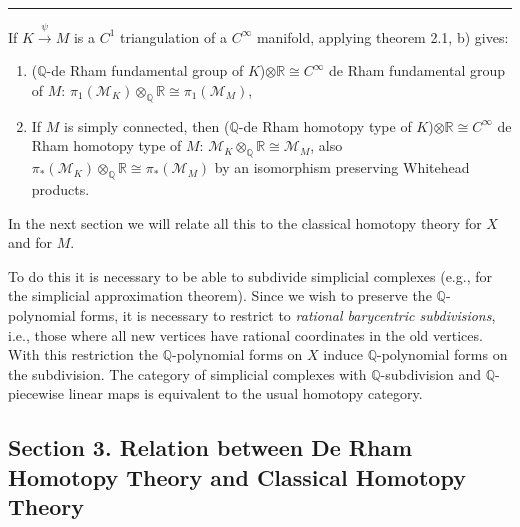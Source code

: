\documentclass[
  english,
  a3paper,
  a3paper]{extarticle}
\begin{document}
\clearpage



\par

\vspace{0.7mm}\hrule\vspace{1.6mm}

\fontsize{9}{11}\selectfont

If \(K\xrightarrow{\psi}M\) is a \(C^1\) triangulation of a \(C^\infty\)
manifold, applying theorem 2.1, b) gives:

\begin{enumerate}
\def\labelenumi{\arabic{enumi})}
\item
  (\(\mathbb Q\)-de Rham fundamental group of
  \(K\))\(\otimes\mathbb R\cong C^\infty\) de Rham fundamental group of
  \(M\):
  \(\pi_1(\mathcal M_K)\otimes_{\mathbb Q}\mathbb R\cong\pi_1(\mathcal M_M)\),
\item
  If \(M\) is simply connected, then (\(\mathbb Q\)-de Rham homotopy
  type of \(K\))\(\otimes\mathbb R\cong C^\infty\) de Rham homotopy type
  of \(M\):
  \(\mathcal M_K\otimes_{\mathbb Q}\mathbb R\cong\mathcal M_M\), also
  \(\pi_*(\mathcal M_K)\otimes_{\mathbb Q}\mathbb R\cong\pi_*(\mathcal M_M)\)
  by an isomorphism preserving Whitehead products.
\end{enumerate}

In the next section we will relate all this to the classical homotopy
theory for \(X\) and for \(M\).

To do this it is necessary to be able to subdivide simplicial complexes
(e.g., for the simplicial approximation theorem). Since we wish to
preserve the \(\mathbb Q\)-polynomial forms, it is necessary to restrict
to \emph{rational barycentric subdivisions}, i.e., those where all new
vertices have rational coordinates in the old vertices. With this
restriction the \(\mathbb Q\)-polynomial forms on \(X\) induce
\(\mathbb Q\)-polynomial forms on the subdivision. The category of
simplicial complexes with \(\mathbb Q\)-subdivision and
\(\mathbb Q\)-piecewise linear maps is equivalent to the usual homotopy
category.

\subsection{Section 3. Relation between De Rham Homotopy Theory and
Classical Homotopy
Theory}\label{section-3.-relation-between-de-rham-homotopy-theory-and-classical-homotopy-theory}
\end{document}
